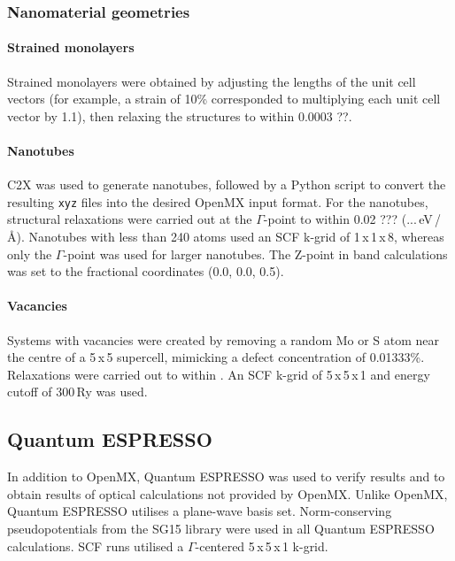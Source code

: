 \documentclass[11pt,a4paper,twoside]{report}  %
\numberwithin{equation}{section}					%
\numberwithin{figure}{section}						%
\begin{document}
\subsubsection{Nanomaterial geometries}


\paragraph{Strained monolayers} Strained monolayers were obtained by adjusting the lengths of the unit cell vectors (for example, a strain of 10\% corresponded to multiplying each unit cell vector by 1.1), then relaxing the structures to within 0.0003 ??. 
\paragraph{Nanotubes} C2X was used to generate nanotubes, followed by a Python script to convert the resulting \texttt{xyz} files into the desired OpenMX input format\autocite{rutterC2xToolVisualisation2018}. For the nanotubes, structural relaxations were carried out at the $\Gamma$-point to within 0.02 ??? (...\,eV\,/\,\AA). Nanotubes with less than 240 atoms used an SCF k-grid of 1\,x\,1\,x\,8, whereas only the $\Gamma$-point was used for larger nanotubes. The Z-point in band calculations was set to the fractional coordinates (0.0, 0.0, 0.5).
\paragraph{Vacancies} Systems with vacancies were created by removing a random Mo or S atom near the centre of a 5\,x\,5 supercell, mimicking a defect concentration of 0.01333\%. Relaxations were carried out to within . An SCF k-grid of 5\,x\,5\,x\,1 and energy cutoff of 300\,Ry was used. 

\subsection{Quantum ESPRESSO\autocite{giannozziQUANTUMESPRESSOModular2009, giannozziAdvancedCapabilitiesMaterials2017}}
In addition to OpenMX, Quantum ESPRESSO was used to verify results and to obtain results of optical calculations not provided by OpenMX. Unlike OpenMX, Quantum ESPRESSO utilises a plane-wave basis set. Norm-conserving pseudopotentials from the SG15 library were used in all Quantum ESPRESSO calculations\autocites{hamannOptimizedNormconservingVanderbilt2013, schlipfOptimizationAlgorithmGeneration2015}. SCF runs utilised a $\Gamma$-centered 5\,x\,5\,x\,1 k-grid. 
\end{document}
